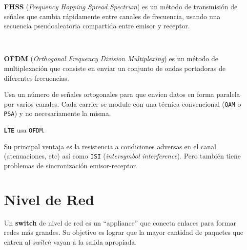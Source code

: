\documentclass[]{article}
\begin{document}

\textbf{FHSS} (\emph{Frequency Hopping Spread Spectrum}) es un método de transmisión de señales que cambia rápidamente entre canales de frecuencia, usando una secuencia pseudoaleatoria compartida entre emisor y receptor.

~\newline
{}


\textbf{OFDM} (\emph{Orthogonal Frequency Division Multiplexing}) es un método de multiplexación que consiste en enviar un conjunto de ondas portadoras de diferentes frecuencias.

Usa un número de señales ortogonales para que envíen datos en forma paralela por varios canales. Cada carrier se module con una técnica convencional (\texttt{QAM} o \texttt{PSA}) y no necesariamente la misma.

\texttt{\textbf{LTE}} usa \texttt{OFDM}.

Su principal ventaja es la resistencia a condiciones adversas en el canal (atenuaciones, etc) así como \texttt{ISI} (\emph{intersymbol interference}). Pero también tiene problemas de sincronización emisor-receptor.



\section{Nivel de Red}
Un \textbf{switch} de nivel de red es un ``appliance'' que conecta enlaces para formar redes más grandes. Su objetivo es lograr que la mayor cantidad de paquetes que entren al \emph{switch} vayan a la salida apropiada.
\end{document}
